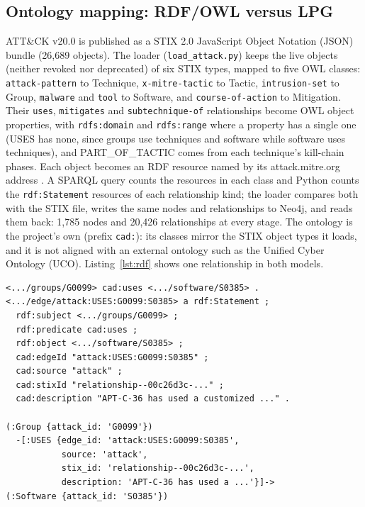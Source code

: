 \documentclass[conference,letterpaper]{IEEEtran}
\newcommand{\code}[1]{\texttt{#1}}
\begin{document}
\subsection{Ontology mapping: RDF/OWL versus LPG}\label{sec:rdf}
ATT\&CK v20.0 is published as a STIX 2.0 JavaScript Object Notation (JSON) bundle (26,689 objects). The loader (\code{load\_attack.py}) keeps the live objects (neither revoked nor deprecated) of six STIX types, mapped to five OWL classes: \code{attack-pattern} to Technique, \code{x-mitre-tactic} to Tactic, \code{intrusion-set} to Group, \code{malware} and \code{tool} to Software, and \code{course-of-action} to Mitigation. Their \code{uses}, \code{mitigates} and \code{subtechnique-of} relationships become OWL object properties, with \code{rdfs:domain} and \code{rdfs:range} where a property has a single one (USES has none, since groups use techniques and software while software uses techniques), and PART\_OF\_TACTIC comes from each technique's kill-chain phases. Each object becomes an RDF resource named by its attack.mitre.org address \cite{rdf11,owl2}. A SPARQL query counts the resources in each class and Python counts the \code{rdf:Statement} resources of each relationship kind; the loader compares both with the STIX file, writes the same nodes and relationships to Neo4j, and reads them back: 1,785 nodes and 20,426 relationships at every stage. The ontology is the project's own (prefix \code{cad:}): its classes mirror the STIX object types it loads, and it is not aligned with an external ontology such as the Unified Cyber Ontology (UCO). Listing~\ref{lst:rdf} shows one relationship in both models.

\begin{lstlisting}[float=t, xleftmargin=0pt, xrightmargin=0pt, caption={The fact ``APT-C-36 uses njRAT'' as RDF (Turtle; \code{.../} abridges https://attack.mitre.org/ and the project's namespace, \code{cad:} is the project ontology) and as an LPG relationship (Cypher pattern). The STIX identifier and the description, which also holds Markdown links and MITRE's citations, are abridged.}, label={lst:rdf}, captionpos=b]
<.../groups/G0099> cad:uses <.../software/S0385> .
<.../edge/attack:USES:G0099:S0385> a rdf:Statement ;
  rdf:subject <.../groups/G0099> ;
  rdf:predicate cad:uses ;
  rdf:object <.../software/S0385> ;
  cad:edgeId "attack:USES:G0099:S0385" ;
  cad:source "attack" ;
  cad:stixId "relationship--00c26d3c-..." ;
  cad:description "APT-C-36 has used a customized ..." .

(:Group {attack_id: 'G0099'})
  -[:USES {edge_id: 'attack:USES:G0099:S0385',
           source: 'attack',
           stix_id: 'relationship--00c26d3c-...',
           description: 'APT-C-36 has used a ...'}]->
(:Software {attack_id: 'S0385'})
\end{lstlisting}
\end{document}

